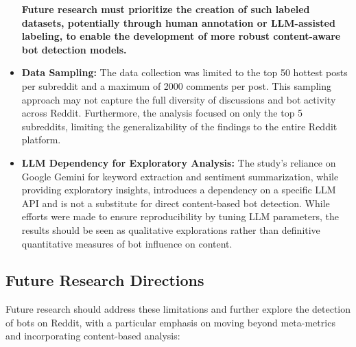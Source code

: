 \documentclass[
  12pt,
  letterpaper,
  DIV=11,
  numbers=noendperiod]{scrartcl}
\begin{document}
\begin{itemize}
  \textbf{Future research must prioritize the creation of such labeled
  datasets, potentially through human annotation or LLM-assisted
  labeling, to enable the development of more robust content-aware bot
  detection models.}
\item
  \textbf{Data Sampling:} The data collection was limited to the top 50
  hottest posts per subreddit and a maximum of 2000 comments per post.
  This sampling approach may not capture the full diversity of
  discussions and bot activity across Reddit. Furthermore, the analysis
  focused on only the top 5 subreddits, limiting the generalizability of
  the findings to the entire Reddit platform.
\item
  \textbf{LLM Dependency for Exploratory Analysis:} The study's reliance
  on Google Gemini for keyword extraction and sentiment summarization,
  while providing exploratory insights, introduces a dependency on a
  specific LLM API and is not a substitute for direct content-based bot
  detection. While efforts were made to ensure reproducibility by tuning
  LLM parameters, the results should be seen as qualitative explorations
  rather than definitive quantitative measures of bot influence on
  content.
\end{itemize}

\subsection{Future Research
Directions}\label{future-research-directions}

Future research should address these limitations and further explore the
detection of bots on Reddit, with a particular emphasis on moving beyond
meta-metrics and incorporating content-based analysis:
\end{document}
